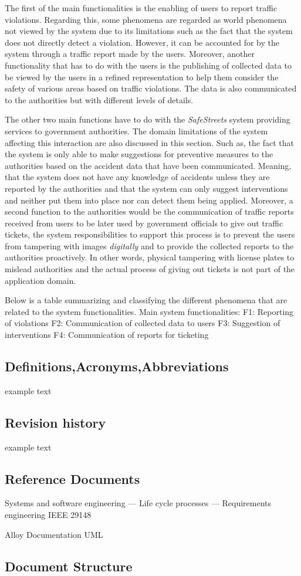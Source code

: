 The first of the main functionalities is the enabling of users to report traffic violations. Regarding this, some phenomena are regarded as world phenomena not viewed by the system due to its limitations such as the fact that the system does not directly detect a violation. However, it can be accounted for by the system through a traffic report made by the users. Moreover, another functionality that has to do with the users is the publishing of collected data to be viewed by the users in a refined representation to help them consider the safety of various areas based on traffic violations. The data is also communicated to the authorities but with different levels of details.

The other two main functions have to do with the \emph{SafeStreets} system providing services to government authorities. The domain limitations of the system affecting this interaction are also discussed in this section. Such as, the fact that the system is only able to make suggestions for preventive measures to the authorities based on the accident data that have been communicated. Meaning, that the system does not have any knowledge of accidents unless they are reported by the authorities and that the system can only suggest interventions and neither put them into place nor can detect them being applied. Moreover, a second function to the authorities would be the communication of traffic reports received from users to be later used by government officials to give out traffic tickets, the system responsibilities to support this process is to prevent the users from tampering with images \emph{digitally} and to provide the collected reports to the authorities proactively. In other words, physical tampering with license plates to mislead authorities and the actual process of giving out tickets is not part of the application domain. 

Below is a table summarizing and classifying the different phenomena that are related to the system functionalities. 
Main system functionalities:
F1: Reporting of violations
F2: Communication of collected data to users
F3: Suggestion of interventions
F4:  Communication of reports for ticketing




\subsection{Definitions,Acronyms,Abbreviations}
	example text


\subsection{Revision history}
	example text


\subsection{Reference Documents}
Systems and software engineering — Life cycle processes — Requirements engineering IEEE 29148

Alloy Documentation
UML


\subsection{Document Structure}

